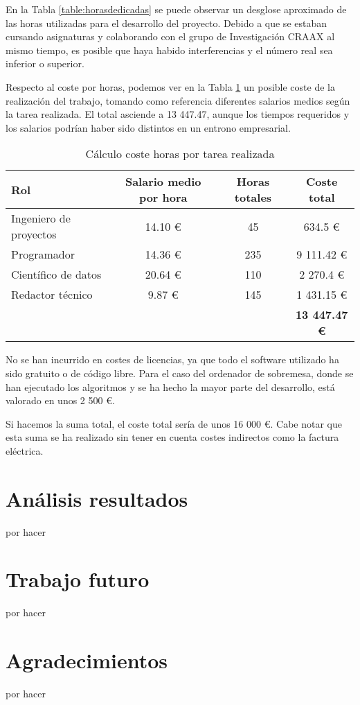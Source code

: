En la Tabla \ref{table:horasdedicadas} se puede observar un desglose aproximado de las horas utilizadas para el desarrollo del proyecto. Debido a que se estaban cursando asignaturas y colaborando con el grupo de Investigación CRAAX al mismo tiempo, es posible que haya habido interferencias y el número real sea inferior o superior. 

Respecto al coste por horas, podemos ver en la Tabla \ref{table:salarios} un posible coste de la realización del trabajo, tomando como referencia diferentes salarios medios según la tarea realizada. El total asciende a 13 447.47, aunque los tiempos requeridos y los salarios podrían haber sido distintos en un entrono empresarial.

\begin{table}[H]
  \centering
  \begin{tabular}{|l | c c c |}
      \hline
      \rowcolor{lightgray} \textbf{Rol} & \textbf{Salario medio por hora}            & \textbf{Horas totales} & \textbf{Coste total} \\ \hline
      Ingeniero de proyectos            & 14.10 € \cite{salarioingenierodeproyectos} &  45                    &    634.5  €          \\
      Programador                       & 14.36 € \cite{salarioprogramador}          & 235                    &  9 111.42 €          \\
      Científico de datos               & 20.64 € \cite{salariodatasci}              & 110                    &  2 270.4  €          \\
      Redactor técnico                  &  9.87 € \cite{salarioredactor}             & 145                    &  1 431.15 €          \\ \hline
      \rowcolor{lightgray}              &                                           &                        & \textbf{13 447.47 €}  \\
      \hline
  \end{tabular}
  \caption{Cálculo coste horas por tarea realizada}
  \label{table:salarios}
\end{table}

No se han incurrido en costes de licencias, ya que todo el software utilizado ha sido gratuito o de código libre. Para el caso del ordenador de sobremesa, donde se han ejecutado los algoritmos y se ha hecho la mayor parte del desarrollo, está valorado en unos 2 500 €.

Si hacemos la suma total, el coste total sería de unos 16 000 €. Cabe notar que esta suma se ha realizado sin tener en cuenta costes indirectos como la factura eléctrica.

\section{Análisis resultados}

por hacer

\section{Trabajo futuro}

por hacer

\section{Agradecimientos}

por hacer

